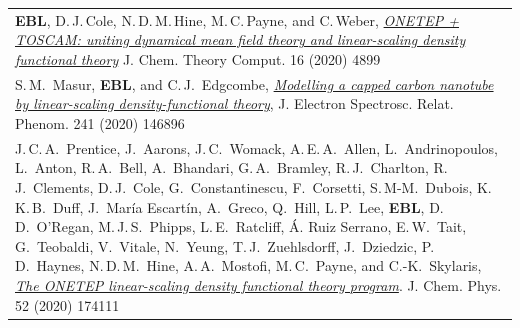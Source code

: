 \documentclass[10pt,a4paper,final]{article}
\begin{document}
\begin{tabularx}{\textwidth}{
   X}
   \footnotesize \textbf{EBL}, D.\,J.\,Cole, N.\,D.\,M.\,Hine, M.\,C.\,Payne, and C.\,Weber, \href{https://doi.org/10.1021/acs.jctc.0c00162}{\textit{ONETEP + TOSCAM: uniting dynamical mean field theory and linear-scaling density functional theory}} J. Chem. Theory Comput. 16 (2020) 4899                                                                                                                                                                                                                                                                                                                                                                                                                                                                                          \\ %
   \footnotesize S.\,M.\ Masur, \textbf{EBL}, and C.\,J.\ Edgcombe, \href{https://www.sciencedirect.com/science/article/pii/S036820481930221X}{\textit{Modelling a capped carbon nanotube by linear-scaling density-functional theory}}, J. Electron Spectrosc. Relat. Phenom. 241 (2020) 146896                                                                                                                                                                                                                                                                                                                                                                                                                                                                                     \\ %
   \footnotesize J.\,C.\,A.\ Prentice, J.\ Aarons, J.\,C.\ Womack, A.\,E.\,A.\ Allen, L.\ Andrinopoulos, L.\ Anton, R.\,A.\ Bell, A.\ Bhandari, G.\,A.\ Bramley, R.\,J.\ Charlton, R.\,J.\ Clements, D.\,J.\ Cole, G.\ Constantinescu, F.\ Corsetti, S.\,M-M.\ Dubois, K.\,K.\,B.\ Duff, J.\ María Escartín, A.\ Greco, Q.\ Hill, L.\,P.\ Lee, \textbf{EBL}, D.\,D.\ O’Regan, M.\,J.\,S.\ Phipps, L.\,E.\ Ratcliff, Á. Ruiz Serrano, E.\,W.\ Tait, G.\ Teobaldi, V.\ Vitale, N.\ Yeung, T.\,J.\ Zuehlsdorff, J.\ Dziedzic, P.\,D.\ Haynes, N.\,D.\,M.\ Hine, A.\,A.\ Mostofi, M.\,C.\ Payne, and C.-K.\ Skylaris, \href{https://aip.scitation.org/doi/full/10.1063/5.0004445}{\textit{The ONETEP linear-scaling density functional theory program}}. J. Chem. Phys. 52 (2020) 174111 \\ %

\end{tabularx}
\end{document}
